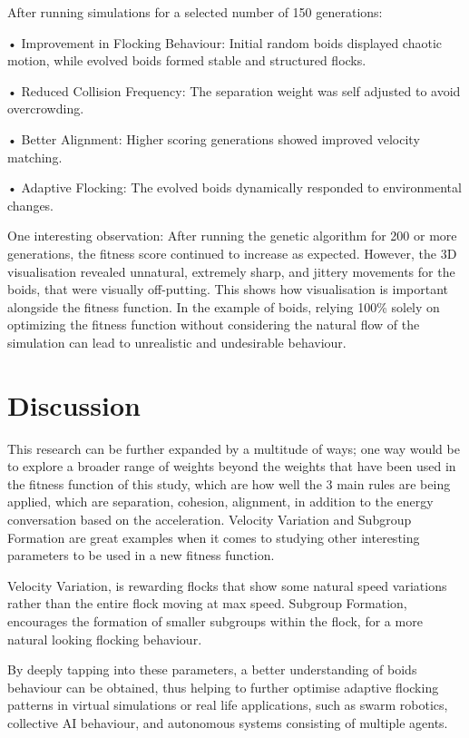 \documentclass[twocolumn, a4paper, 12pt]{article}
\begin{document}
After running simulations for a selected number of 150 generations:

• Improvement in Flocking Behaviour: Initial random boids displayed chaotic motion, while evolved boids formed stable and structured flocks.

• Reduced Collision Frequency: The separation weight was self adjusted to avoid overcrowding.

• Better Alignment: Higher scoring generations showed improved velocity matching.

• Adaptive Flocking: The evolved boids dynamically responded to environmental changes.

One interesting observation: After running the genetic algorithm for 200 or more generations, the fitness score continued to increase as expected. However, the 3D visualisation revealed unnatural, extremely sharp, and jittery movements for the boids, that were visually off-putting. This shows how visualisation is important alongside the fitness function. In the example of boids, relying 100\% solely on optimizing the fitness function without considering the natural flow of the simulation can lead to unrealistic and undesirable behaviour.


\section{Discussion}
This research can be further expanded by a multitude of ways; one way would be to explore a broader range of weights beyond the weights that have been used in the fitness function of this study, which are how well the 3 main rules are being applied, which are separation, cohesion, alignment, in addition to the energy conversation based on the acceleration. Velocity Variation and Subgroup Formation are great examples when it comes to studying other interesting parameters to be used in a new fitness function.

Velocity Variation, is rewarding flocks that show some natural speed variations rather than the entire flock moving at max speed. Subgroup Formation, encourages the formation of smaller subgroups within the flock, for a more natural looking flocking behaviour.

By deeply tapping into these parameters, a better understanding of boids behaviour can be obtained, thus helping to further optimise adaptive flocking patterns in virtual simulations or real life applications, such as swarm robotics, collective AI behaviour, and autonomous systems consisting of multiple agents.
\end{document}
